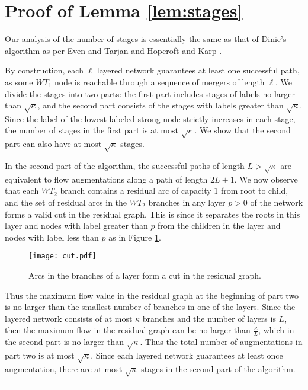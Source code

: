 \documentclass{article}
\newenvironment{proof}[1][Proof:]{\begin{trivlist}
\item[\hskip \labelsep {\bfseries #1}]}{\end{trivlist}}
\newcommand{\qed}{\hfill \rule{2.5mm}{2.5mm}}
\begin{document}
\clearpage
\newpage
\appendix

\section{Proof of Lemma \ref{lem:stages}}
\label{proof:stages}

\begin{proof}
Our analysis of the number of stages is essentially the same as that of Dinic's algorithm as per Even and Tarjan \cite{EveT75} and Hopcroft and Karp \cite{HopK73}.

By construction, each $\ell$ layered network guarantees at least one successful path, as some $WT_1$ node is reachable through a sequence of mergers of length $\ell$. We divide the stages into two parts: the first part includes stages of labels no larger than $\sqrt{\kappa}$, and the second part consists of the stages with labels greater than $\sqrt{\kappa}$.  Since the label of the lowest labeled strong node strictly increases in each stage, the number of stages in the first part is at most $\sqrt{\kappa}$. We show that the second part can also have at most $\sqrt{\kappa}$ stages.

In the second part of the algorithm, the successful paths of length $L > \sqrt{\kappa}$ are equivalent to flow augmentations along a path of length $2L+1$.  We now observe that each $WT_2$ branch contains a residual arc of capacity $1$ from root to child, and the set of residual arcs in the $WT_2$ branches in any layer $p> 0$ of the network forms a valid cut in the residual graph.  This is since it separates the roots in this layer and nodes with label greater than $p$ from the children in the layer and nodes with label less than $p$ as in Figure \ref{fig:cut}.

\begin{figure}[ht]
\centerline{\texttt{[image: cut.pdf]}}
\caption{\label{fig:cut}Arcs in the branches of a layer form a cut in the residual graph.}
\end{figure}

Thus the maximum flow value in the residual graph at the beginning of part two is no larger than the smallest number of branches in one of the layers. Since the layered network consists of at most $\kappa$ branches and the number of layers is $L$, then the maximum flow in the residual graph can be no larger than $\frac{\kappa }{L}$, which in the second part is no larger than $\sqrt{\kappa}$. Thus the total number of augmentations in part two is at most $\sqrt{\kappa}$. Since each layered network guarantees at least once augmentation, there are at most $\sqrt{\kappa}$ stages in the second part of the algorithm. \qed
\end{proof}
\end{document}
